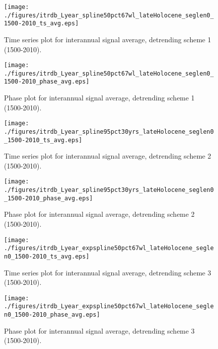 \documentclass[phd,tocprelim]{cornell}
\begin{document}
\begin{figure}[!tbp]
\centering
\begin{minipage}[b]{0.45\textwidth}
\texttt{[image: ./figures/itrdb\_Lyear\_spline50pct67wl\_lateHolocene\_seglen0\_1500-2010\_ts\_avg.eps]}
\caption{Time series plot for interannual signal average, detrending scheme 1 (1500-2010).}
\label{ts1avg}
\end{minipage}
\hfill
\begin{minipage}[b]{0.45\textwidth}
\texttt{[image: ./figures/itrdb\_Lyear\_spline50pct67wl\_lateHolocene\_seglen0\_1500-2010\_phase\_avg.eps]}
\caption{Phase plot for interannual signal average, detrending scheme 1 (1500-2010).}
\label{map1avg}
\end{minipage}
\end{figure}

\begin{figure}[!tbp]
\centering
\begin{minipage}[b]{0.45\textwidth}
\texttt{[image: ./figures/itrdb\_Lyear\_spline95pct30yrs\_lateHolocene\_seglen0\_1500-2010\_ts\_avg.eps]}
\caption{Time series plot for interannual signal average, detrending scheme 2 (1500-2010).}
\label{ts2avg}
\end{minipage}
\hfill
\begin{minipage}[b]{0.45\textwidth}
\texttt{[image: ./figures/itrdb\_Lyear\_spline95pct30yrs\_lateHolocene\_seglen0\_1500-2010\_phase\_avg.eps]}
\caption{Phase plot for interannual signal average, detrending scheme 2 (1500-2010).}
\label{map2avg}
\end{minipage}
\end{figure}

\begin{figure}[!tbp]
\centering
\begin{minipage}[b]{0.45\textwidth}
\texttt{[image: ./figures/itrdb\_Lyear\_expspline50pct67wl\_lateHolocene\_seglen0\_1500-2010\_ts\_avg.eps]}
\caption{Time series plot for interannual signal average, detrending scheme 3 (1500-2010).}
\label{ts3avg}
\end{minipage}
\hfill
\begin{minipage}[b]{0.45\textwidth}
\texttt{[image: ./figures/itrdb\_Lyear\_expspline50pct67wl\_lateHolocene\_seglen0\_1500-2010\_phase\_avg.eps]}
\caption{Phase plot for interannual signal average, detrending scheme 3 (1500-2010).}
\label{map3avg}
\end{minipage}
\end{figure}
\end{document}
